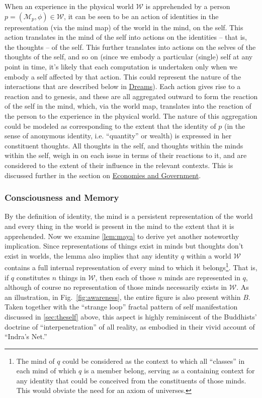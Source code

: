 \documentclass[pra,twocolumn,groupedaddress,10pt]{revtex4}
\theoremstyle{definition}
\begin{document}
When an experience in the physical world $\mathcal{W}$ is apprehended by a person $p = (\mathcal{M}_{p}, \phi) \in \mathcal{W}$, it can be seen to be an action of identities in the representation (via the mind map) of the world in the mind, on the self. This action translates in the mind of the self into actions on the identities -- that is, the thoughts -- of the self. This further translates into actions on the selves of the thoughts of the self, and so on (since we embody a particular (single) self at any point in time, it's likely that each computation is undertaken only when we embody a self affected by that action. This could represent the nature of the interactions that are described below in \hyperref[sec:dreams]{Dreams}). Each action gives rise to a reaction and to genesis, and these are all aggregated outward to form the reaction of the self in the mind, which, via the world map, translates into the reaction of the person to the experience in the physical world. The nature of this aggregation could be modeled as corresponding to the extent that the identity of $p$ (in the sense of anonymous identity, i.e. ``quantity'' or wealth) is expressed in her constituent thoughts. All thoughts in the self, and thoughts within the minds within the self, weigh in on each issue in terms of their reactions to it, and are considered to the extent of their influence in the relevant contexts. This is discussed further in the section on \hyperref[sec:ecogovintpro]{Economies and Government}.

\subsubsection{Consciousness and Memory} \label{sec:memory}

By the definition of identity, the mind is a persistent representation of the world and every thing in the world is present in the mind to the extent that it is apprehended. Now we examine \autoref{lem:maya} to derive yet another noteworthy implication. Since representations of things exist in minds but thoughts don't exist in worlds, the lemma also implies that any identity $q$ within a world $\mathcal{W}$ contains a full internal representation of every mind to which it belongs\footnote{The mind of $q$ could be considered as the context to which all ``classes'' in each mind of which $q$ is a member belong, serving as a containing context for any identity that could be conceived from the constituents of those minds. This would obviate the need for an axiom of universes.}. That is, if $q$ constitutes $n$ things in $\mathcal{W}$, then each of those $n$ minds are represented in $q$, although of course no representation of those minds necessarily exists in $\mathcal{W}$. As an illustration, in Fig.~\ref{fig:awareness}, the entire figure is also present within $B$. Taken together with the ``strange loop'' fractal pattern of self manifestation discussed in \autoref{sec:theself} above, this aspect is highly reminiscent of the Buddhists' doctrine of ``interpenetration'' of all reality, as embodied in their vivid account of ``Indra's Net.''\cite{avatamsaka}
\end{document}

